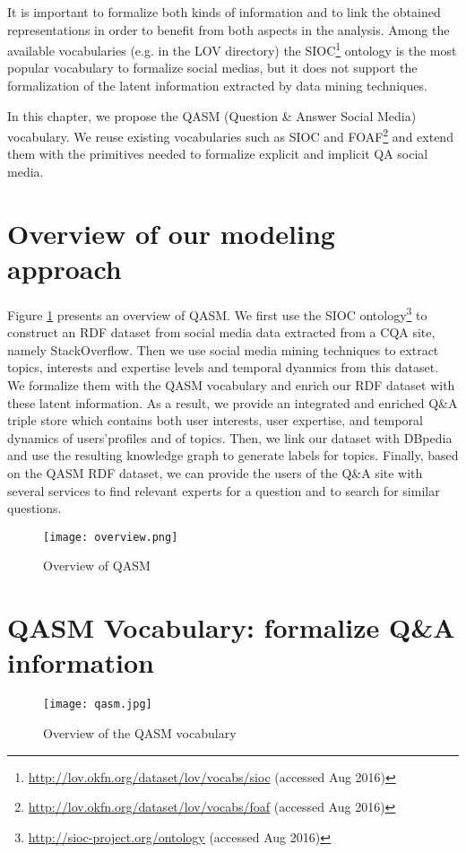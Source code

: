 It is important to formalize both kinds of information and to link the obtained representations in order to benefit from both aspects in the analysis. Among the available vocabularies (e.g. in the LOV directory) the SIOC\footnote{\url{http://lov.okfn.org/dataset/lov/vocabs/sioc} (accessed Aug 2016)} ontology is the most popular vocabulary to formalize social medias, but it does not support the formalization of the latent information extracted by data mining techniques.


In this chapter, we propose the QASM (Question \& Answer Social Media) vocabulary. We reuse existing vocabularies such as SIOC and FOAF\footnote{\url{http://lov.okfn.org/dataset/lov/vocabs/foaf} (accessed Aug 2016)} and extend them with the primitives needed to formalize explicit and implicit QA social media.


\section{Overview of our modeling approach}
Figure \ref{fig:overview} presents an overview of QASM. We first use the SIOC ontology\footnote{\url{http://sioc-project.org/ontology} (accessed Aug 2016)} to construct an RDF dataset from social media data extracted from a CQA site, namely StackOverflow. Then we use social media mining techniques to extract topics, interests and expertise levels and temporal dyanmics from this dataset. We formalize them with the QASM vocabulary and enrich our RDF dataset with these latent information. As a result, we provide an integrated and enriched Q\&A triple store which contains both user interests, user expertise, and temporal dynamics of users'profiles and of topics. 
Then, we link our dataset with DBpedia and use the resulting knowledge graph to generate labels for topics. Finally, based on the QASM RDF dataset, we can provide the users of the Q\&A site with several services to find relevant experts for a question and to search for similar questions.

\begin{figure}%
\centering
\texttt{[image: overview.png]}  
\caption{Overview of QASM}
\label{fig:overview} 
\end{figure}

\section{QASM Vocabulary: formalize Q\&A information}
\begin{sidewaysfigure}
\centering
\texttt{[image: qasm.jpg]}
\caption{Overview of the QASM vocabulary}
\label{fig:coreontology} 
\end{sidewaysfigure}

